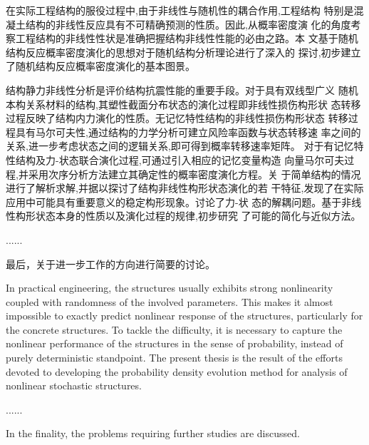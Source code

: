 \begin{cabstract}
在实际工程结构的服役过程中,由于非线性与随机性的耦合作用,工程结构
特别是混凝土结构的非线性反应具有不可精确预测的性质。因此,从概率密度演
化的角度考察工程结构的非线性性状是准确把握结构非线性性能的必由之路。本
文基于随机结构反应概率密度演化的思想对于随机结构分析理论进行了深入的
探讨,初步建立了随机结构反应概率密度演化的基本图景。

结构静力非线性分析是评价结构抗震性能的重要手段。对于具有双线型广义
随机本构关系材料的结构,其塑性截面分布状态的演化过程即非线性损伤构形状
态转移过程反映了结构内力演化的性质。无记忆特性结构的非线性损伤构形状态
转移过程具有马尔可夫性,通过结构的力学分析可建立风险率函数与状态转移速
率之间的关系,进一步考虑状态之间的逻辑关系,即可得到概率转移速率矩阵。
对于有记忆特性结构及力-状态联合演化过程,可通过引入相应的记忆变量构造
向量马尔可夫过程,并采用次序分析方法建立其确定性的概率密度演化方程。关
于简单结构的情况进行了解析求解,并据以探讨了结构非线性构形状态演化的若
干特征,发现了在实际应用中可能具有重要意义的稳定构形现象。讨论了力-状
态的解耦问题。基于非线性构形状态本身的性质以及演化过程的规律,初步研究
了可能的简化与近似方法。

......

最后，关于进一步工作的方向进行简要的讨论。

\end{cabstract}



\begin{eabstract}
In practical engineering, the structures usually exhibits strong nonlinearity
coupled with randomness of the involved parameters. This makes it almost impossible
to exactly predict nonlinear response of the structures, particularly for the concrete
structures. To tackle the difficulty, it is necessary to capture the nonlinear performance
of the structures in the sense of probability, instead of purely deterministic standpoint.
The present thesis is the result of the efforts devoted to developing the probability
density evolution method for analysis of nonlinear stochastic structures.

......

In the finality, the problems requiring further studies are discussed.
\end{eabstract}



